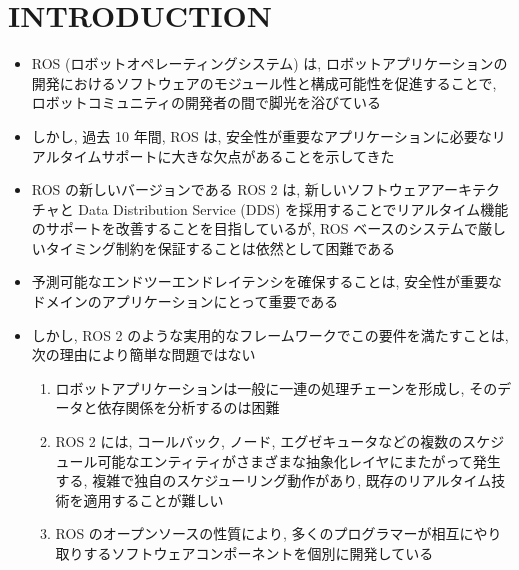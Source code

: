 
\section{INTRODUCTION}
\label{sec: introduction}

\begin{frame}{}
    \begin{itemize}
        \item ROS (ロボットオペレーティングシステム) は, ロボットアプリケーションの開発におけるソフトウェアのモジュール性と構成可能性を促進することで, ロボットコミュニティの開発者の間で脚光を浴びている
        \item しかし, 過去 10 年間, ROS は, 安全性が重要なアプリケーションに必要なリアルタイムサポートに大きな欠点があることを示してきた
        \item ROS の新しいバージョンである ROS 2 は, 新しいソフトウェアアーキテクチャと Data Distribution Service (DDS) を採用することでリアルタイム機能のサポートを改善することを目指しているが, ROS ベースのシステムで厳しいタイミング制約を保証することは依然として困難である
    \end{itemize}
\end{frame}

\begin{frame}{}
    \begin{itemize}
        \item 予測可能なエンドツーエンドレイテンシを確保することは, 安全性が重要なドメインのアプリケーションにとって重要である
        \item しかし, ROS 2 のような実用的なフレームワークでこの要件を満たすことは, 次の理由により簡単な問題ではない
              \begin{enumerate}
                  \item ロボットアプリケーションは一般に一連の処理チェーンを形成し, そのデータと依存関係を分析するのは困難
                  \item ROS 2 には, コールバック, ノード, エグゼキュータなどの複数のスケジュール可能なエンティティがさまざまな抽象化レイヤにまたがって発生する, 複雑で独自のスケジューリング動作があり, 既存のリアルタイム技術を適用することが難しい
                  \item ROS のオープンソースの性質により, 多くのプログラマーが相互にやり取りするソフトウェアコンポーネントを個別に開発している
              \end{enumerate}
    \end{itemize}
\end{frame}

